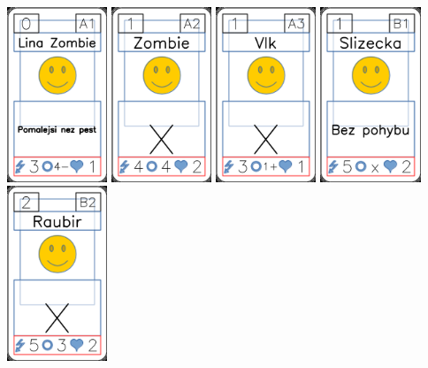 \documentclass[a4paper]{article}
\begin{document}
	\includegraphics[width=3.0cm]{img-3_0}
	\includegraphics[width=3.0cm]{img-3_1}
	\includegraphics[width=3.0cm]{img-3_2}
	\includegraphics[width=3.0cm]{img-3_3}
	\includegraphics[width=3.0cm]{img-3_4}
\end{document}
